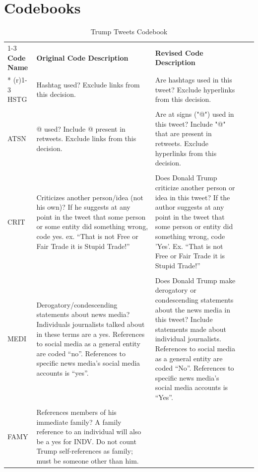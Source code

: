 \documentclass{article}
\begin{document}
\clearpage
\section{Codebooks}
\label{sec:codebooks}


\begin{longtable}{@{}lp{6cm}p{7cm}ll@{}}
\caption{Trump Tweets Codebook}\\
\cmidrule(r){1-3}
\textbf{Code Name} &
  \textbf{Original Code Description} &
  \textbf{Revised Code Description} &
   &
   \\* \cmidrule(r){1-3}
\endfirsthead
%
\endhead
%
HSTG &
  Hashtag used?  Exclude   links from this decision. &
  Are hashtags used in this tweet?    Exclude hyperlinks from this decision. &
   &
   \\ \\
ATSN &
  @ used?  Include @ present   in retweets.  Exclude links from this   decision. &
  Are at signs ("@") used in this tweet?  Include "@" that are present in   retweets.  Exclude hyperlinks from this   decision. &
   &
   \\ \\
CRIT &
  Criticizes another person/idea (not his own)?  If he suggests at any point in the tweet   that some person or some entity did something wrong, code yes.  ex. “That is not Free or Fair Trade it is   Stupid Trade!” &
  Does Donald Trump criticize another person or idea in this   tweet?  If the author suggests at any   point in the tweet that some person or entity did something wrong, code   'Yes'.  Ex. “That is not Free or Fair   Trade it is Stupid Trade!” &
   &
   \\ \\
MEDI &
  Derogatory/condescending statements about news media?  Individuals journalists talked about in   these terms are a yes.  References to   social media as a general entity are coded “no”.  References to specific news media’s social   media accounts is “yes”. &
  Does Donald Trump make derogatory or condescending statements   about the news media in this tweet?    Include statements made about individual journalists.  References to social media as a general   entity are coded “No”.  References to   specific news media’s social media accounts is “Yes”. &
   &
   \\ \\
FAMY &
  References members of his immediate family?  A family reference to an individual will   also be a yes for INDV.  Do not count   Trump self-references as family; must be someone other than him. &

\end{longtable}
\end{document}
